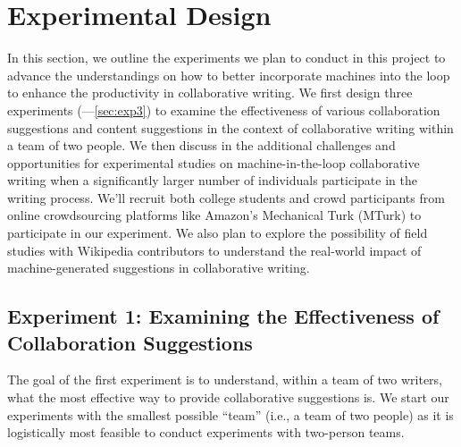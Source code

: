
\section{Experimental Design}

In this section, we outline the experiments we plan to conduct in this project to advance the understandings on how to better incorporate machines into the loop to enhance the productivity in collaborative writing. We first design three experiments (---\ref{sec:exp3}) to examine the effectiveness of various collaboration suggestions and content suggestions in the context of collaborative writing within a team of two people. We then discuss in  the additional challenges and opportunities for experimental studies on machine-in-the-loop collaborative writing when a significantly larger number of individuals participate in the writing process. We'll recruit both college students and crowd participants from online crowdsourcing platforms like Amazon's Mechanical Turk (MTurk) to participate in our experiment. We also plan to explore the possibility of field studies with Wikipedia contributors to understand the real-world impact of machine-generated suggestions in collaborative writing.

\subsection{Experiment 1: Examining the Effectiveness of Collaboration Suggestions}
\label{sec:exp1}

The goal of the first experiment is to understand, within a team of two writers, what the most effective way to provide collaborative suggestions is. We start our experiments with the smallest possible ``team'' (i.e., a team of two people) as it is logistically most feasible to conduct experiments with two-person teams. 

